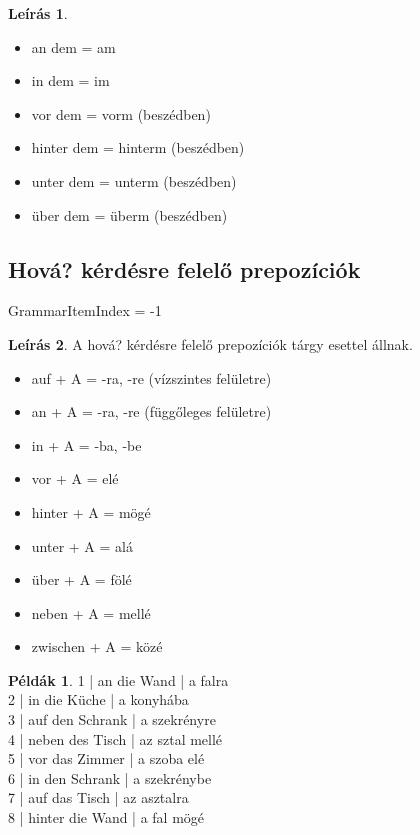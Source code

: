 \documentclass{article}
\theoremstyle{definition}
\newtheorem*{exmp}{Példák}
\newtheorem*{desc}{Leírás}
\begin{document}
\begin{desc}
\begin{itemize}
\item an dem = am
\item in dem = im
\item vor dem = vorm (beszédben)
\item hinter dem = hinterm (beszédben)
\item unter dem = unterm (beszédben)
\item über dem = überm (beszédben)
\end{itemize}
\end{desc}

\subsection{Hová? kérdésre felelő prepozíciók}

GrammarItemIndex = -1

\begin{desc}
A hová? kérdésre felelő prepozíciók tárgy esettel állnak.

\begin{itemize}
\item auf + A = -ra, -re (vízszintes felületre)
\item an + A = -ra, -re (függőleges felületre)
\item in + A = -ba, -be
\item vor + A = elé
\item hinter + A = mögé
\item unter + A = alá
\item über + A = fölé
\item neben + A = mellé
\item zwischen + A = közé
\end{itemize}
\end{desc}

\begin{exmp}
1 | an die Wand | a falra\\
2 | in die Küche | a konyhába\\
3 | auf den Schrank | a szekrényre\\
4 | neben des Tisch | az sztal mellé\\
5 | vor das Zimmer | a szoba elé\\
6 | in den Schrank | a szekrénybe\\
7 | auf das Tisch | az asztalra\\
8 | hinter die Wand | a fal mögé\\
\end{exmp}
\end{document}
